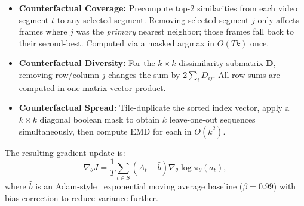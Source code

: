 \documentclass[letterpaper]{article} %
\begin{document}
\begin{itemize}
    \item \textbf{Counterfactual Coverage:} Precompute top-2 similarities from each video segment $t$ to any selected segment. Removing selected segment $j$ only affects frames where $j$ was the \emph{primary} nearest neighbor; those frames fall back to their second-best. Computed via a masked argmax in $O(T k)$ once.
    \item \textbf{Counterfactual Diversity:} For the $k \times k$ dissimilarity submatrix $\mathbf{D}$, removing row/column $j$ changes the sum by $2\sum_i D_{ij}$. All row sums are computed in one matrix-vector product.
    \item \textbf{Counterfactual Spread:} Tile-duplicate the sorted index vector, apply a $k \times k$ diagonal boolean mask to obtain $k$ leave-one-out sequences simultaneously, then compute EMD for each in $O(k^2)$.
\end{itemize}

The resulting gradient update is:
\begin{equation}
    \nabla_\theta J = \frac{1}{T}\sum_{t \in S}\!\left(A_t - \hat{b}\right)\nabla_\theta \log \pi_\theta(a_t),
\end{equation}
where $\hat{b}$ is an Adam-style~\cite{kingma2015adam} exponential moving average baseline ($\beta = 0.99$) with bias correction to reduce variance further.
\end{document}
